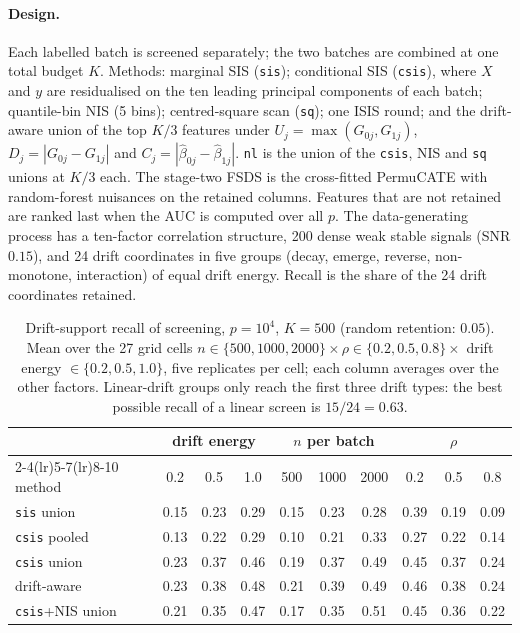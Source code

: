 \paragraph{Design.}
Each labelled batch is screened separately; the two batches are combined at one total budget $K$. Methods: marginal SIS (\texttt{sis}); conditional SIS (\texttt{csis}), where $X$ and $y$ are residualised on the ten leading principal components of each batch; quantile-bin NIS (5 bins); centred-square scan (\texttt{sq}); one ISIS round; and the drift-aware union of the top $K/3$ features under $U_j=\max(G_{0j},G_{1j})$, $D_j=|G_{0j}-G_{1j}|$ and $C_j=|\hat\beta_{0j}-\hat\beta_{1j}|$. \texttt{nl} is the union of the \texttt{csis}, NIS and \texttt{sq} unions at $K/3$ each. The stage-two FSDS is the cross-fitted PermuCATE with random-forest nuisances on the retained columns. Features that are not retained are ranked last when the AUC is computed over all $p$. The data-generating process has a ten-factor correlation structure, 200 dense weak stable signals (SNR $0.15$), and 24 drift coordinates in five groups (decay, emerge, reverse, non-monotone, interaction) of equal drift energy. Recall is the share of the 24 drift coordinates retained.

\begin{table}[h]
\centering
\caption{Drift-support recall of screening, $p=10^4$, $K=500$ (random retention: $0.05$). Mean over the 27 grid cells $n\in\{500,1000,2000\}\times\rho\in\{0.2,0.5,0.8\}\times$ drift energy $\in\{0.2,0.5,1.0\}$, five replicates per cell; each column averages over the other factors. Linear-drift groups only reach the first three drift types: the best possible recall of a linear screen is $15/24=0.63$.}
\label{tab:screen-grid}
\small
\begin{tabular}{lccc ccc ccc}
\toprule
 & \multicolumn{3}{c}{drift energy} & \multicolumn{3}{c}{$n$ per batch} & \multicolumn{3}{c}{$\rho$} \\
\cmidrule(lr){2-4}\cmidrule(lr){5-7}\cmidrule(lr){8-10}
method & 0.2 & 0.5 & 1.0 & 500 & 1000 & 2000 & 0.2 & 0.5 & 0.8 \\
\midrule
\texttt{sis} union     & 0.15 & 0.23 & 0.29 & 0.15 & 0.23 & 0.28 & 0.39 & 0.19 & 0.09 \\
\texttt{csis} pooled   & 0.13 & 0.22 & 0.29 & 0.10 & 0.21 & 0.33 & 0.27 & 0.22 & 0.14 \\
\texttt{csis} union    & 0.23 & 0.37 & 0.46 & 0.19 & 0.37 & 0.49 & 0.45 & 0.37 & 0.24 \\
drift-aware            & 0.23 & 0.38 & 0.48 & 0.21 & 0.39 & 0.49 & 0.46 & 0.38 & 0.24 \\
\texttt{csis}+NIS union & 0.21 & 0.35 & 0.47 & 0.17 & 0.35 & 0.51 & 0.45 & 0.36 & 0.22 \\
\bottomrule
\end{tabular}
\end{table}

